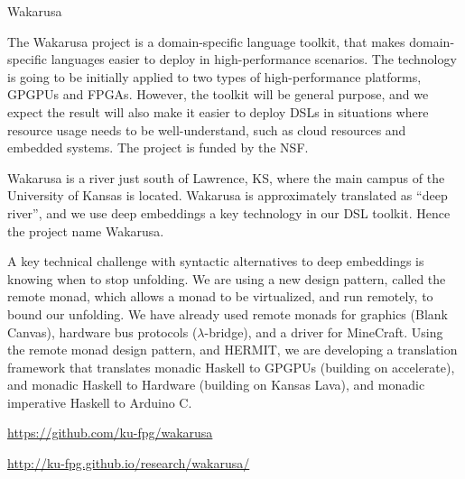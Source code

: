 \begin{hcarentry}{Wakarusa}
\label{Wakarusa}
\makeheader

The Wakarusa project is a domain-specific language toolkit,
that makes domain-specific languages easier to deploy in
high-performance scenarios. The technology is going to be initially
applied to two types of high-performance platforms, GPGPUs and
FPGAs. However, the toolkit will be general purpose, and we expect the
result will also make it easier to deploy DSLs in situations where
resource usage needs to be well-understand, such as cloud resources
and embedded systems. The project is funded by the NSF.

Wakarusa is a river just south of Lawrence, KS, where the main campus
of the University of Kansas is located. Wakarusa is approximately
translated as ``deep river'', and we use deep embeddings a key
technology in our DSL toolkit. Hence the project name Wakarusa.

A key technical challenge with syntactic alternatives to deep embeddings
is knowing when to stop unfolding. We are using a new design pattern,
called the remote monad, which allows a monad to be virtualized, and
run remotely, to bound our unfolding. 
%
We have already used remote monads for graphics (Blank Canvas),
hardware bus protocols ($\lambda$-bridge), and a driver for MineCraft.
Using the remote monad design pattern, and HERMIT, we are developing
a translation framework that translates monadic Haskell to GPGPUs (building on
accelerate), and monadic Haskell to Hardware (building on Kansas Lava),
and monadic imperative Haskell to Arduino C.

\FurtherReading
\begin{compactitem}
\item
  \url{https://github.com/ku-fpg/wakarusa}
\item
  \url{http://ku-fpg.github.io/research/wakarusa/}
\end{compactitem}
\end{hcarentry}
